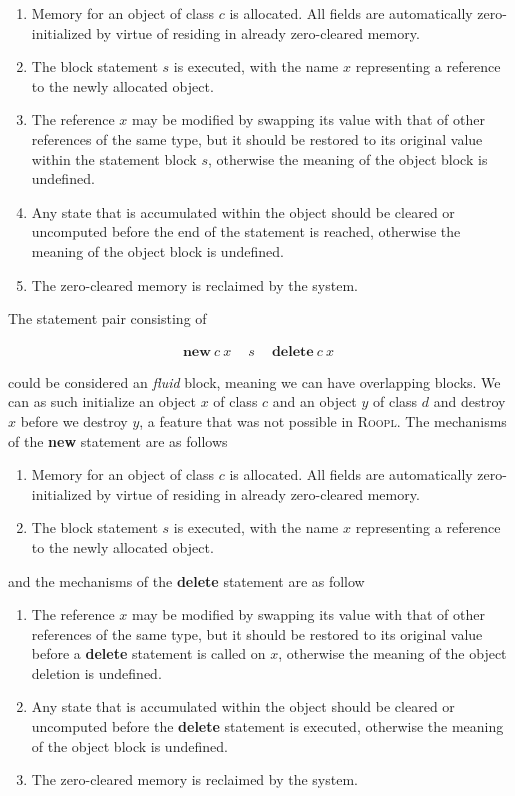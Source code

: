\begin{enumerate}
\item Memory for an object of class $c$ is allocated. All fields are automatically zero-initialized by virtue of residing in already zero-cleared memory.
\item The block statement $s$ is executed, with the name $x$ representing a reference to the newly allocated object.
\item The reference $x$ may be modified by swapping its value with that of other references of the same type, but it should be restored to its original value within the statement block $s$, otherwise the meaning of the object block is undefined.
\item Any state that is accumulated within the object should be cleared or uncomputed before the end of the statement is reached, otherwise the meaning of the object block is undefined.
\item The zero-cleared memory is reclaimed by the system.
\end{enumerate}

The statement pair consisting of

\begin{align*}
\textbf{new}\ c\ x\ \quad s\ \quad \textbf{delete}\ c\ x\
\end{align*}

could be considered an \textit{fluid} block, meaning we can have overlapping blocks. We can as such initialize an object $x$ of class $c$ and an object $y$ of class $d$ and destroy $x$ before we destroy $y$, a feature that was not possible in \textsc{Roopl}. The mechanisms of the \textbf{new} statement are as follows

\begin{enumerate}
\item Memory for an object of class $c$ is allocated. All fields are automatically zero-initialized by virtue of residing in already zero-cleared memory.
\item The block statement $s$ is executed, with the name $x$ representing a reference to the newly allocated object.
\end{enumerate}

and the mechanisms of the \textbf{delete} statement are as follow

\begin{enumerate}
\item The reference $x$ may be modified by swapping its value with that of other references of the same type, but it should be restored to its original value before a \textbf{delete} statement is called on $x$, otherwise the meaning of the object deletion is undefined.
\item Any state that is accumulated within the object should be cleared or uncomputed before the \textbf{delete} statement is executed, otherwise the meaning of the object block is undefined.
\item The zero-cleared memory is reclaimed by the system.
\end{enumerate}

